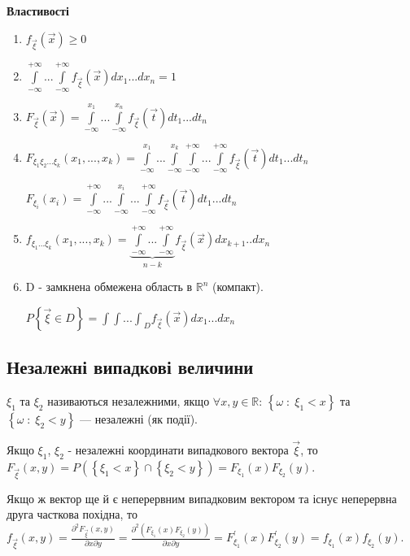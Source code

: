 \noindent \textbf{Властивості}
\begin{enumerate}
    \item $f_{\vec{\xi}}(\vec{x}) \geq 0$
    \item $\int\limits_{-\infty}^{+\infty}...\int\limits_{-\infty}^{+\infty}
    f_{\vec{\xi}} (\vec{x})dx_1...dx_n = 1$
    \item $F_{\vec{\xi}}(\vec{x}) = 
    \int\limits_{-\infty}^{x_1}...\int\limits_{-\infty}^{x_n}
    f_{\vec{\xi}} (\vec{t})dt_1...dt_n$
    \item $F_{\xi_1\xi_2...\xi_k}(x_1, ..., x_k) = 
    \int\limits_{-\infty}^{x_1}...\int\limits_{-\infty}^{x_k}
    \int\limits_{-\infty}^{+\infty}...\int\limits_{-\infty}^{+\infty}
    f_{\vec{\xi}} (\vec{t})dt_1...dt_n$

    $F_{\xi_i}(x_i) = \int\limits_{-\infty}^{+\infty}...
    \int\limits_{-\infty}^{x_i}...\int\limits_{-\infty}^{+\infty}
    f_{\vec{\xi}} (\vec{t})dt_1...dt_n$

    \item $f_{\xi_1...\xi_k}(x_1, ..., x_k) = 
    \underbrace{
        \int\limits_{-\infty}^{+\infty} 
        ... 
        \int\limits_{-\infty}^{+\infty}
    }_{n-k} f_{\vec{\xi}}(\vec{x}) dx_{k+1}..dx_n$
    \item D - замкнена обмежена область в $\mathbb{R}^n$ (компакт).
    
    $P\left\{\vec{\xi} \in D\right\} = {\int\int...\int}_D f_{\vec{\xi}}(\vec{x})
    dx_1 ... dx_n$
\end{enumerate}

\subsection{Незалежні випадкові величини}
\begin{definition}
    $\xi_1$ та $\xi_2$ називаються незалежними, якщо 
    $\forall x, y \in \mathbb{R}$:  
    $\left\{\omega\;:\;\xi_1 < x\right\}$ та $\left\{\omega\;:\;\xi_2 < y\right\}$ ---
    незалежні (як події).
\end{definition}
\begin{remark}
    Якщо $\xi_1$, $\xi_2$ - незалежні координати випадкового вектора $\vec{\xi}$, 
    то $F_{\vec{\xi}}(x, y) = 
    P\left(\left\{\xi_1 < x\right\} \cap \left\{\xi_2 < y\right\}\right) = 
    F_{\xi_1}(x)F_{\xi_2}(y)$.

    Якщо ж вектор ще й є неперервним випадковим вектором та існує неперервна 
    друга часткова похідна, то
    $f_{\vec{\xi}}(x, y) = \frac{\partial^2 F_{\vec{\xi}}(x, y)}
    {\partial x \partial y} = \frac{\partial^2(F_{\xi_1}(x)F_{\xi_2}(y))}{\partial x \partial y} 
    = F_{\xi_1}^\prime (x)F_{\xi_2}^\prime (y) = 
    f_{\xi_1}(x)f_{\xi_2}(y)$.
\end{remark}
